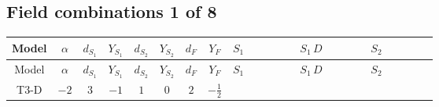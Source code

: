 \documentclass[8pt]{article}
\begin{document}
\begin{landscape}
\subsection*{Field combinations 1 of 8}
\begin{longtable}{@{}cccccccc >{\raggedright\arraybackslash}p{0.21\linewidth} >{\raggedright\arraybackslash}p{0.21\linewidth} >{\raggedright\arraybackslash}p{0.21\linewidth}@{}}
\toprule
Model & $\alpha$ & $d_{S_1}$ & $Y_{S_1}$ & $d_{S_2}$ & $Y_{S_2}$ & $d_F$ & $Y_F$ & $S_1$ & $S_1\,D$ & $S_2$ \\
\midrule
\endfirsthead
\toprule
Model & $\alpha$ & $d_{S_1}$ & $Y_{S_1}$ & $d_{S_2}$ & $Y_{S_2}$ & $d_F$ & $Y_F$ & $S_1$ & $S_1\,D$ & $S_2$ \\
\midrule
\endhead
T3-D & $-2$ & $3$ & $-1$ & $1$ & $0$ & $2$ & $-\frac{1}{2}$ & \scriptsize\adjustbox{max width=\linewidth}{$\begin{gathered} +\frac{2 \hbar  \overline{y_{1,i_1,r_1}} \overline{y_{1,i_2,r_2}} S_{1,j_2}^2 y_{1,i_1,r_2} y_{1,i_2,r_1} \left(S_{1,j_1}{}^{\dagger }\right){}^2}{3 \epsilon } \\ -C_{S_1^\dagger S_1} S_{1,j_1} S_{1,j_1}{}^{\dagger } \\ +\frac{C_{S_1^\dagger S_1} \hbar  \overline{y_{1,i_1,r_1}} S_{1,j_1} y_{1,i_1,r_1} S_{1,j_1}{}^{\dagger }}{\sqrt{3}}\end{gathered}$} & \scriptsize\adjustbox{max width=\linewidth}{$\begin{gathered} +D_{\mu _1}\left(S_{1,j_1}\right){}^{\dagger } D_{\mu _1}\left(S_{1,j_1}\right)\end{gathered}$} & \scriptsize\adjustbox{max width=\linewidth}{$\begin{gathered} -\frac{2 \hbar  \overline{y_{2,i_1,r_1}} \overline{y_{2,i_2,r_2}} S_2^2 y_{2,i_1,r_2} y_{2,i_2,r_1} \left(S_2{}^{\dagger }\right){}^2}{\epsilon } \\ -C_{S_2^\dagger S_2} S_2 S_2{}^{\dagger } \\ +C_{S_2^\dagger S_2} \hbar  \overline{y_{2,i_1,r_1}} S_2 y_{2,i_1,r_1} S_2{}^{\dagger }\end{gathered}$} \\

\end{longtable}
\end{landscape}
\end{document}
